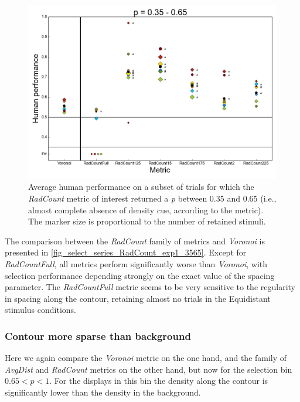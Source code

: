 \documentclass[12pt]{article}
\begin{document}
\begin{figure}
\includegraphics{Figures/FIG_SUP_select_series_RadCount_exp1_3565.png}
\caption{Average human performance on a subset of trials for which the \emph{RadCount} metric of interest returned a \emph{p} between 0.35 and 0.65 (i.e., almost complete absence of density cue, according to the metric). The marker size is proportional to the number of retained stimuli.}
\label{fig_select_series_RadCount_exp1_3565}
\end{figure}

The comparison between the \emph{RadCount} family of metrics and \emph{Voronoi} is presented in \autoref{fig_select_series_RadCount_exp1_3565}. Except for \emph{RadCountFull}, all metrics perform significantly worse than \emph{Voronoi}, with selection performance depending strongly on the exact value of the spacing parameter. The \emph{RadCountFull} metric seems to be very sensitive to the regularity in spacing along the contour, retaining almost no trials in the Equidistant stimulus conditions.

\subsubsection{Contour more sparse than background}

Here we again compare the \emph{Voronoi} metric on the one hand, and the family of \emph{AvgDist} and \emph{RadCount} metrics on the other hand, but now for the selection bin $0.65 < p < 1$. For the displays in this bin the density along the contour is significantly lower than the density in the background.
\end{document}
